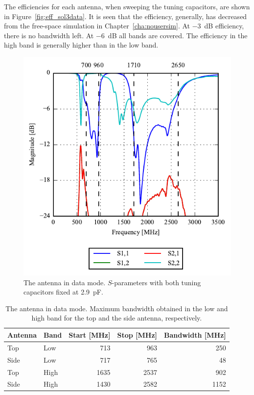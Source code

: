 The efficiencies for each antenna, when sweeping the tuning capacitors, are shown in Figure~\ref{fig:eff_sol3data}. It is seen that the efficiency, generally, has decreased from the free-space simulation in Chapter~\ref{cha:nousersim}. At \SI{-3}{dB} efficiency, there is no bandwidth left. At \SI{-6}{dB} all bands are covered. The efficiency in the high band is generally higher than in the low band.

\begin{figure}[htbp]
    \centering
    \includegraphics{img/tech_sol/nonresonant/simulation/data_mode/s_params_cMax.pdf}
    \caption{The antenna in data mode. $S$-parameters with both tuning capacitors fixed at \SI{2.9}{pF}.}
    \label{fig:ant3_sparam_data}
\end{figure}

\begin{table}[htbp]
    \centering
    \begin{tabular}{|l|l|r|r|r|}
        \hline
        Antenna & Band & Start [MHz] & Stop [MHz] & Bandwidth [MHz] \\
        \hline
        Top     & Low  & 713         & 963       & 250 \\
        Side    & Low  & 717         & 765        & 48  \\
        \hline
        Top     & High & 1635         & 2537       & 902 \\
        Side    & High & 1430        & 2582       & 1152 \\
        \hline
    \end{tabular}
    \caption{The antenna in data mode. Maximum bandwidth obtained in the low and high band for the top and the side antenna, respectively.}
    \label{tab:bw_sol3data}
\end{table}


